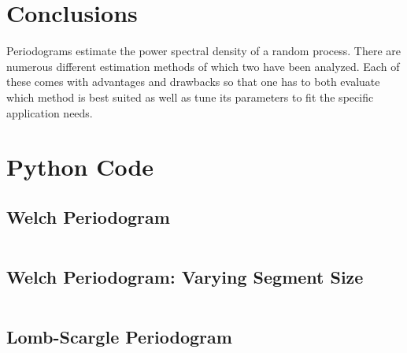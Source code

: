 \documentclass[10pt, a4paper]{article}
\begin{document}






\section{Conclusions}
Periodograms estimate the power spectral density of a random process. There are numerous different estimation methods of which two have been analyzed. Each of these comes with advantages and drawbacks so that one has to both evaluate which method is best suited as well as tune its parameters to fit the specific application needs.


\printbibheading
\begin{refsection}
\nocite{*}
\printbibliography[heading=subbibliography,title={Literature}]
\end{refsection}

\begin{refsection}
\nocite{*}
\printbibliography[heading=subbibliography,title={Software Used}]
\end{refsection}

\pagebreak
\appendix
\section{Python Code}\label{app:script}

\subsection{Welch Periodogram}\label{app:welch}
\inputminted{python}{./code/welch1.py}

\subsection{Welch Periodogram: Varying Segment Size}\label{app:welch_comp}
\inputminted{python}{./code/welch_comp.py}

\subsection{Lomb-Scargle Periodogram}\label{app:lomb}
\inputminted{python}{./code/lombscargle1.py}
\end{document}
